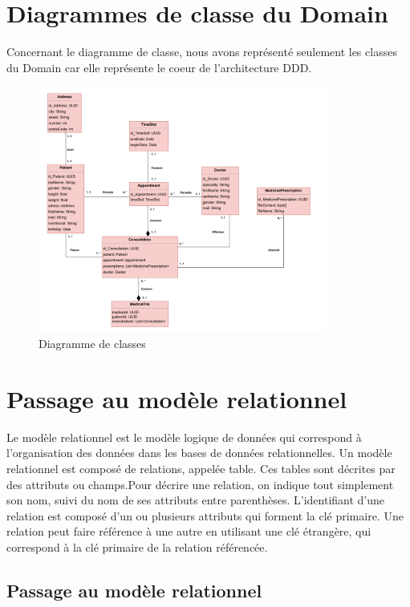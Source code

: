 \documentclass[a4paper]{report}
\begin{document}
\section{Diagrammes de classe du Domain}
Concernant le diagramme de classe, nous avons représenté seulement les classes du Domain car elle représente le coeur de l'architecture DDD.
\begin{figure}[H]
    \vspace{-10pt}
    \centering
    \includegraphics[width=0.85\textwidth]{besoins/class_diagram.png}
    \caption{Diagramme de classes}
    \label{fig:DCU9}
\end{figure}

\section{Passage au modèle relationnel}
Le modèle relationnel est le modèle logique de données qui correspond à l'organisation des données dans les bases de données relationnelles.
Un modèle relationnel est composé de relations, appelée table. Ces tables sont décrites par des attributs ou champs.Pour décrire une relation, on indique tout simplement son
nom, suivi du nom de ses attributs entre parenthèses. L'identifiant d'une relation
est composé d'un ou plusieurs attributs qui forment la clé primaire. Une relation
peut faire référence à une autre en utilisant une clé étrangère, qui correspond à
la clé primaire de la relation référencée. 


\subsection{Passage au modèle relationnel}
\end{document}
